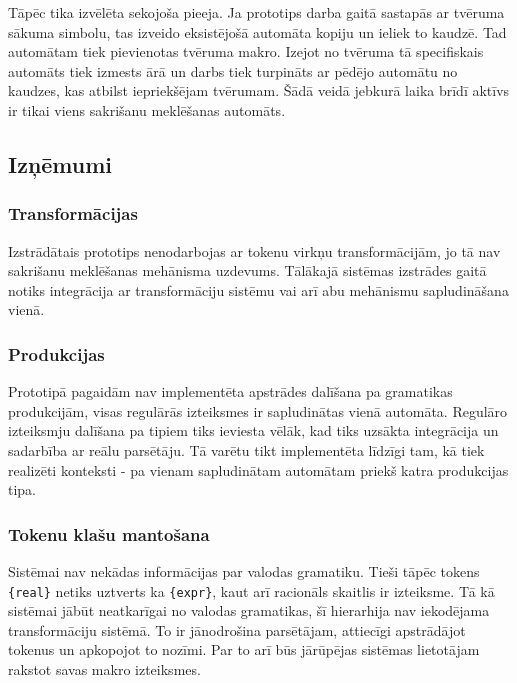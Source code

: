 Tāpēc tika izvēlēta sekojoša pieeja. Ja prototips darba gaitā sastapās ar tvēruma sākuma simbolu, tas izveido eksistējošā automāta kopiju un ieliek to kaudzē. Tad automātam tiek pievienotas tvēruma makro. Izejot no tvēruma tā specifiskais automāts tiek izmests ārā un darbs tiek turpināts ar pēdējo automātu no kaudzes, kas atbilst iepriekšējam tvērumam. Šādā veidā jebkurā laika brīdī aktīvs ir tikai viens sakrišanu meklēšanas automāts.

\subsection{\label{sbs:sol_problems}Izņēmumi}

\subsubsection{Transformācijas}

Izstrādātais prototips nenodarbojas ar tokenu virkņu transformācijām, jo tā nav sakrišanu meklēšanas mehānisma uzdevums. Tālākajā sistēmas izstrādes gaitā notiks integrācija ar transformāciju sistēmu vai arī abu mehānismu sapludināšana vienā.

\subsubsection{Produkcijas}

Prototipā pagaidām nav implementēta apstrādes dalīšana pa gramatikas produkcijām, visas regulārās izteiksmes ir sapludinātas vienā automāta. Regulāro izteiksmju dalīšana pa tipiem tiks ieviesta vēlāk, kad tiks uzsākta integrācija un sadarbība ar reālu parsētāju. Tā varētu tikt implementēta līdzīgi tam, kā tiek realizēti konteksti - pa vienam sapludinātam automātam priekš katra produkcijas tipa.

\subsubsection{Tokenu klašu mantošana}

Sistēmai nav nekādas informācijas par valodas gramatiku. Tieši tāpēc tokens \verb|{real}| netiks uztverts ka \verb|{expr}|, kaut arī racionāls skaitlis ir izteiksme. Tā kā sistēmai jābūt neatkarīgai no valodas gramatikas, šī hierarhija nav iekodējama transformāciju sistēmā. To ir jānodrošina parsētājam, attiecīgi apstrādājot tokenus un apkopojot to nozīmi. Par to arī būs jārūpējas sistēmas lietotājam rakstot savas makro izteiksmes.

